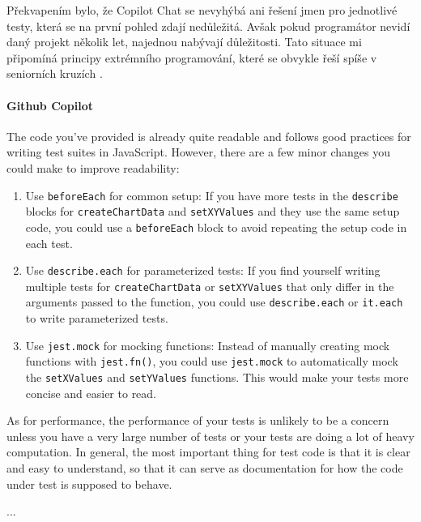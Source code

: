 \documentclass[FM,DP]{tulthesis}
\begin{document}
		Překvapením bylo, že Copilot Chat se nevyhýbá ani řešení jmen pro jednotlivé testy, která se na první pohled zdají nedůležitá. Avšak pokud programátor nevidí daný projekt několik let, najednou nabývají důležitosti. Tato situace mi připomíná principy extrémního programování, které se obvykle řeší spíše v seniorních kruzích \cite{parametrized_testing_fe} \cite{TDD}.
		
		\vspace{0.6em}
		\begin{tcolorbox}[colback=white,colframe=black]
			
			\paragraph{Github Copilot}
			The code you've provided is already quite readable and follows good practices for writing test suites in JavaScript. However, there are a few minor changes you could make to improve readability:
			
			\begin{enumerate}
				\item Use \verb|beforeEach| for common setup: If you have more tests in the \verb|describe| blocks for \verb|createChartData| and \verb|setXYValues| and they use the same setup code, you could use a \verb|beforeEach| block to avoid repeating the setup code in each test.
				
				\item Use \verb|describe.each| for parameterized tests: If you find yourself writing multiple tests for \verb|createChartData| or \verb|setXYValues| that only differ in the arguments passed to the function, you could use \verb|describe.each| or \verb|it.each| to write parameterized tests.
				
				\item Use \verb|jest.mock| for mocking functions: Instead of manually creating mock functions with \verb|jest.fn()|, you could use \verb|jest.mock| to automatically mock the \verb|setXValues| and \verb|setYValues| functions. This would make your tests more concise and easier to read.
			\end{enumerate}
			
			As for performance, the performance of your tests is unlikely to be a concern unless you have a very large number of tests or your tests are doing a lot of heavy computation. In general, the most important thing for test code is that it is clear and easy to understand, so that it can serve as documentation for how the code under test is supposed to behave.
			
			
			... \cite{parametrized_testing_fe}
		\end{tcolorbox}
		\vspace{0.6em}
		
\end{document}
